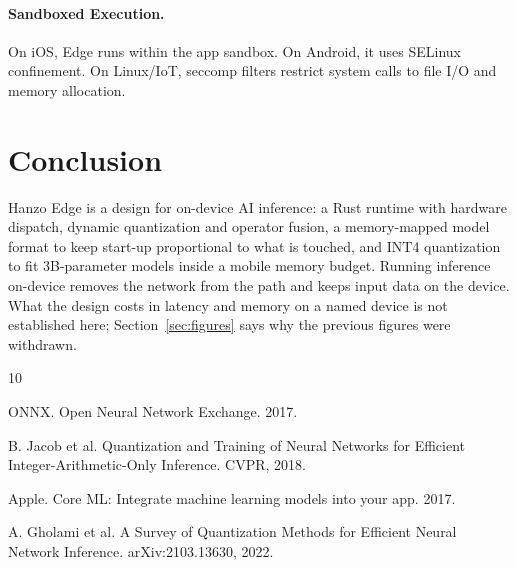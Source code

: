 \documentclass[11pt,twocolumn]{article}
\begin{document}
\paragraph{Sandboxed Execution.} On iOS, Edge runs within the app sandbox. On Android, it uses SELinux confinement. On Linux/IoT, seccomp filters restrict system calls to file I/O and memory allocation.

\section{Conclusion}

Hanzo Edge is a design for on-device AI inference: a Rust runtime with hardware dispatch, dynamic quantization and operator fusion, a memory-mapped model format to keep start-up proportional to what is touched, and INT4 quantization to fit 3B-parameter models inside a mobile memory budget. Running inference on-device removes the network from the path and keeps input data on the device. What the design costs in latency and memory on a named device is not established here; Section~\ref{sec:figures} says why the previous figures were withdrawn.


\begin{thebibliography}{10}

ONNX. Open Neural Network Exchange. 2017.

B. Jacob et al. Quantization and Training of Neural Networks for Efficient Integer-Arithmetic-Only Inference. CVPR, 2018.

Apple. Core ML: Integrate machine learning models into your app. 2017.

A. Gholami et al. A Survey of Quantization Methods for Efficient Neural Network Inference. arXiv:2103.13630, 2022.

\end{thebibliography}
\end{document}
